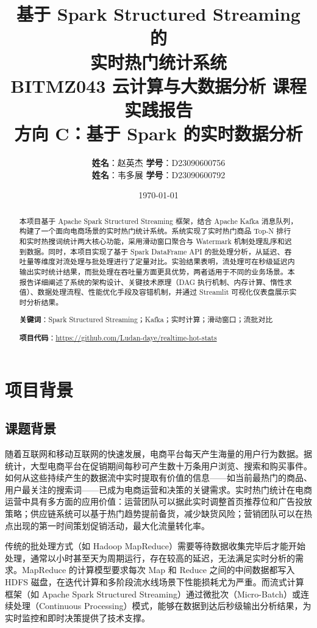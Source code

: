 \documentclass[12pt,a4paper]{article}
\title{
    \vspace{-1cm}
    {\LARGE\textbf{基于 Spark Structured Streaming 的\\实时热门统计系统}} \\[0.5cm]
    {\large BITMZ043 云计算与大数据分析 \quad 课程实践报告} \\[0.3cm]
    {\normalsize 方向 C：基于 Spark 的实时数据分析}
}
\author{
    \textbf{姓名}：赵英杰 \quad \textbf{学号}：D23090600756 \\[0.2cm]
    \textbf{姓名}：韦多展 \quad \textbf{学号}：D23090600792
}
\date{\today}
\begin{document}
\maketitle
\thispagestyle{fancy}

\begin{abstract}
本项目基于 Apache Spark Structured Streaming 框架，结合 Apache Kafka 消息队列，构建了一个面向电商场景的实时热门统计系统。系统实现了实时热门商品 Top-N 排行和实时热搜词统计两大核心功能，采用滑动窗口聚合与 Watermark 机制处理乱序和迟到数据。同时，本项目实现了基于 Spark DataFrame API 的批处理分析，从延迟、吞吐量等维度对流处理与批处理进行了定量对比。实验结果表明，流处理可在秒级延迟内输出实时统计结果，而批处理在吞吐量方面更具优势，两者适用于不同的业务场景。本报告详细阐述了系统的架构设计、关键技术原理（DAG 执行机制、内存计算、惰性求值）、数据处理流程、性能优化手段及容错机制，并通过 Streamlit 可视化仪表盘展示实时分析结果。

\noindent\textbf{关键词}：Spark Structured Streaming；Kafka；实时计算；滑动窗口；流批对比

\noindent\textbf{项目代码}：\url{https://github.com/Ludan-daye/realtime-hot-stats}
\end{abstract}

\tableofcontents
\newpage

\section{项目背景}

\subsection{课题背景}

随着互联网和移动互联网的快速发展，电商平台每天产生海量的用户行为数据。据统计，大型电商平台在促销期间每秒可产生数十万条用户浏览、搜索和购买事件。如何从这些持续产生的数据流中实时提取有价值的信息——如当前最热门的商品、用户最关注的搜索词——已成为电商运营和决策的关键需求。实时热门统计在电商运营中具有多方面的应用价值：运营团队可以据此实时调整首页推荐位和广告投放策略；供应链系统可以基于热门趋势提前备货，减少缺货风险；营销团队可以在热点出现的第一时间策划促销活动，最大化流量转化率。

传统的批处理方式（如 Hadoop MapReduce）需要等待数据收集完毕后才能开始处理，通常以小时甚至天为周期运行，存在较高的延迟，无法满足实时分析的需求。MapReduce 的计算模型要求每次 Map 和 Reduce 之间的中间数据都写入 HDFS 磁盘，在迭代计算和多阶段流水线场景下性能损耗尤为严重。而流式计算框架（如 Apache Spark Structured Streaming）通过微批次（Micro-Batch）或连续处理（Continuous Processing）模式，能够在数据到达后秒级输出分析结果，为实时监控和即时决策提供了技术支撑。
\end{document}
